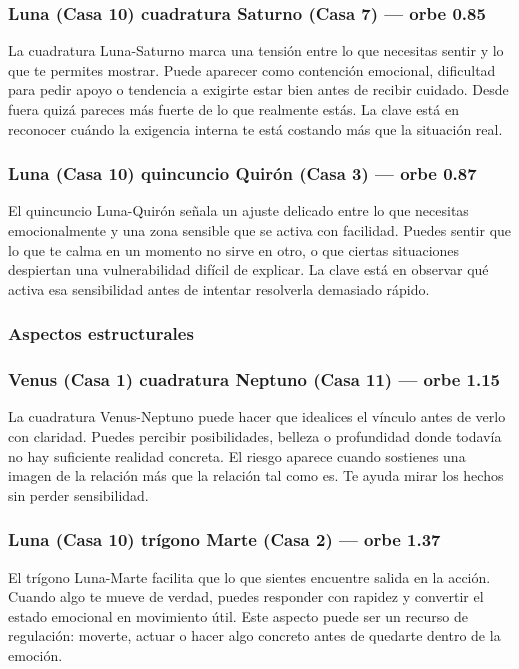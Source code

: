 \documentclass[11pt,a4paper]{article}\usepackage[utf8]{inputenc}
\begin{document}
\subsubsection*{Luna (Casa 10) cuadratura Saturno (Casa 7) --- orbe 0.85\textdegree}
La cuadratura Luna-Saturno marca una tensión entre lo que necesitas sentir y lo que te permites mostrar. Puede aparecer como contención emocional, dificultad para pedir apoyo o tendencia a exigirte estar bien antes de recibir cuidado. Desde fuera quizá pareces más fuerte de lo que realmente estás. La clave está en reconocer cuándo la exigencia interna te está costando más que la situación real.

\subsubsection*{Luna (Casa 10) quincuncio Quirón (Casa 3) --- orbe 0.87\textdegree}
El quincuncio Luna-Quirón señala un ajuste delicado entre lo que necesitas emocionalmente y una zona sensible que se activa con facilidad. Puedes sentir que lo que te calma en un momento no sirve en otro, o que ciertas situaciones despiertan una vulnerabilidad difícil de explicar. La clave está en observar qué activa esa sensibilidad antes de intentar resolverla demasiado rápido.

\vspace{0.8cm}
\subsubsection*{Aspectos estructurales}
\subsubsection*{Venus (Casa 1) cuadratura Neptuno (Casa 11) --- orbe 1.15\textdegree}
La cuadratura Venus-Neptuno puede hacer que idealices el vínculo antes de verlo con claridad. Puedes percibir posibilidades, belleza o profundidad donde todavía no hay suficiente realidad concreta. El riesgo aparece cuando sostienes una imagen de la relación más que la relación tal como es. Te ayuda mirar los hechos sin perder sensibilidad.

\subsubsection*{Luna (Casa 10) trígono Marte (Casa 2) --- orbe 1.37\textdegree}
El trígono Luna-Marte facilita que lo que sientes encuentre salida en la acción. Cuando algo te mueve de verdad, puedes responder con rapidez y convertir el estado emocional en movimiento útil. Este aspecto puede ser un recurso de regulación: moverte, actuar o hacer algo concreto antes de quedarte dentro de la emoción.
\end{document}
